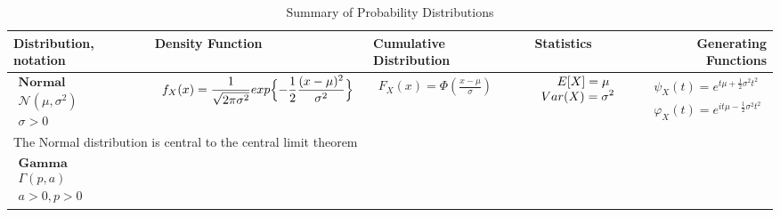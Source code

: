 \documentclass{article}
\begin{document}
\begin{landscape}
\begin{table}[ht]
\begin{tabular}{@{}l p{6.0cm} p{5cm} p{3.0cm} r@{}}
        \bottomrule
        \end{tabular}
        \end{table}


\begin{table}[ht]
\centering
\caption{Summary of Probability Distributions}
\label{tab:probability_distributions}

\begin{tabular}{@{}l p{6.0cm} p{5cm} p{3.0cm} r@{}}
\toprule
Distribution, notation & Density Function & Cumulative Distribution & Statistics & Generating Functions \\ 
\midrule
$\begin{array}{l}
        \textbf{Normal} \\
        \mathcal{N}(\mu, \sigma^2) \\
        \sigma > 0
\end{array}$ & 
$\begin{array}{l}
\displaystyle f_X(x) = \frac{1}{\sqrt{2\pi \sigma^2}} exp \Bigl\{  -\frac{1}{2} \frac{(x-\mu)^2}{\sigma^2}\Bigr\}\\
\end{array}$ & 
$\begin{array}{l}
    \displaystyle F_X(x) = \Phi \left(\frac{x-\mu}{\sigma}\right)
\end{array}$ & 
$\begin{array}{l}
\displaystyle \hspace{0.45cm}  E[X] = \mu \\
\displaystyle Var(X) = \sigma^2
\end{array}$ & 
$\begin{array}{r}
\displaystyle \psi_X(t) = e^{t\mu + \frac{1}{2} \sigma^2 t^2} \\
\displaystyle \varphi_X(t) = e^{it\mu - \frac{1}{2} \sigma^2 t^2}
\end{array}$ \\
\multicolumn{4}{p{19cm}}{The Normal distribution is central to the central limit theorem} \\



$\begin{array}{l}
    \textbf{Gamma} \\
    \Gamma(p, a) \\
    a > 0, p > 0
\end{array}$ & 


\end{tabular}
\end{table}
\end{landscape}
\end{document}
